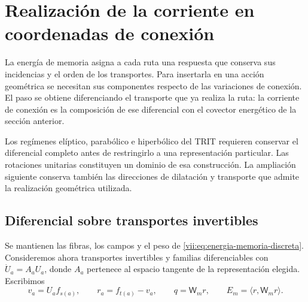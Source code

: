 
\section{Realización de la corriente en coordenadas de conexión}
\label{vii:sec:composicion-corriente-conexion}

La energía de memoria asigna a cada ruta una respuesta que conserva sus
incidencias y el orden de los transportes. Para insertarla en una acción
geométrica se necesitan sus componentes respecto de las variaciones de
conexión. El paso se obtiene diferenciando el transporte que ya realiza
la ruta: la corriente de conexión es la composición de ese diferencial
con el covector energético de la sección anterior.

Los regímenes elíptico, parabólico e hiperbólico del TRIT requieren
conservar el diferencial completo antes de restringirlo a una
representación particular. Las rotaciones unitarias constituyen un
dominio de esa construcción. La ampliación siguiente conserva también
las direcciones de dilatación y transporte que admite la realización
geométrica utilizada.

\subsection{Diferencial sobre transportes invertibles}

Se mantienen las fibras, los campos y el peso de
\eqref{vii:eq:energia-memoria-discreta}. Consideremos ahora transportes
invertibles y familias diferenciables con
\(\dot U_a=A_aU_a\), donde \(A_a\) pertenece al espacio tangente
de la representación elegida. Escribimos
\[
 v_a=U_af_{s(a)},\qquad r_a=f_{t(a)}-v_a,\qquad
 q=\mathsf W_mr,\qquad E_m=\langle r,\mathsf W_mr\rangle.
\]

